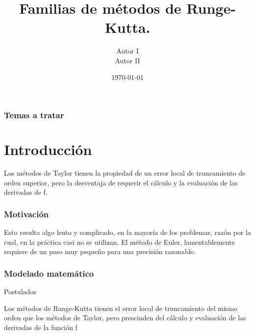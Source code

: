 \documentclass{beamer}
\title[M\'etodos de Runge-Kutta]{Familias de m\'etodos de Runge-Kutta.}
\author[Autores]{Autor I \\ Autor II}
\date{\today}
\begin{document}

\begin{frame}
	\frametitle{Temas a tratar} 
	\tableofcontents 
\end{frame}

\section{Introducci\'on}
\begin{frame}
\begin{minipage}{10cm}
	Los m\'etodos de Taylor tienen la propiedad de un error local de truncamiento de orden superior, pero la desventaja de requerir el c\'alculo y la evaluaci\'on de las derivadas de f.
\end{minipage}
\end{frame}

\begin{frame}
\frametitle{Motivaci\'on}
\begin{minipage}{10cm}
Esto resulta algo lento y complicado, en la mayor\'ia de los problemas, raz\'on por la cual, en la pr\'actica casi no se utilizan. El método de Euler, lamentablemente requiere de un paso muy pequeño para una precisi\'on razonable. 
\end{minipage}
\end{frame}	

\begin{frame}
	\frametitle{Modelado matem\'atico }
\begin{alertblock}{\begin{dinglist}{45}
			\item Postulados
	\end{dinglist}}
    \begin{minipage}{10cm}
	Los m\'etodos de Runge-Kutta tienen el error local de truncamiento del mismo orden que los m\'etodos de Taylor, pero prescinden del c\'alculo y evaluaci\'on de las derivadas de la funci\'on f
     \end{minipage}
\end{alertblock}
\end{frame}
\end{document}
